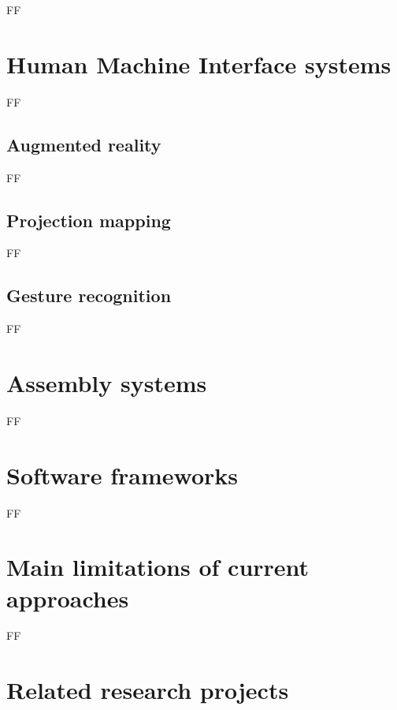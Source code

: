 FF


\section{Human Machine Interface systems}

FF


\subsection{Augmented reality}

FF


\subsection{Projection mapping}

FF


\subsection{Gesture recognition}

FF


\section{Assembly systems}

FF


\section{Software frameworks}

FF


\section{Main limitations of current approaches}

FF


\section{Related research projects}

